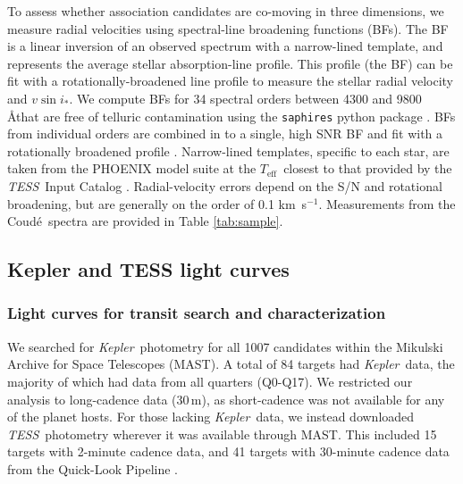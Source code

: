 \documentclass[twocolumn]{aastex631}
\newcommand{\starname}{KOI-3876}
\newcommand{\starnametwo}{Kepler-970}
\newcommand{\vsini}{$v\sin{i_*}$}
\newcommand{\kepler}{{\it Kepler}}
\newcommand{\teff}{\ensuremath{T_{\text{eff}}}}
\newcommand\kms{km~s$^{-1}$}
\newcommand{\tess}{\textit{TESS}}
\newcommand{\coude}{Coud{\'e}}
\begin{document}
To assess whether association candidates are co-moving in three dimensions, we measure radial velocities using spectral-line broadening functions (BFs). The BF is a linear inversion of an observed spectrum with a narrow-lined template, and represents the average stellar absorption-line profile. This profile (the BF) can be fit with a rotationally-broadened line profile to measure the stellar radial velocity and \vsini. We compute BFs for 34 spectral orders between 4300 and 9800 \AA that are free of telluric contamination using the {\tt saphires} python package \citep{Tofflemireetal2019}. BFs from individual orders are combined in to a single, high SNR BF and fit with a rotationally broadened profile \citep{Gray1992}. Narrow-lined templates, specific to each star, are taken from the \citet{2013A&A...553A...6H} PHOENIX model suite at the \teff\ closest to that provided by the \tess\ Input Catalog \citep[v8.0;][]{TIC2019}. Radial-velocity errors depend on the S/N and rotational broadening, but are generally on the order of 0.1 \kms. Measurements from the \coude\ spectra are provided in Table \ref{tab:sample}.

\subsection{Kepler and TESS light curves}\label{sec:lc}

\subsubsection{Light curves for transit search and characterization}
We searched for \kepler\ photometry for all 1007 candidates within the Mikulski Archive for Space Telescopes (MAST). A total of 84 targets had \kepler\ data, the majority of which had data from all quarters (Q0-Q17). We restricted our analysis to long-cadence data (30\,m), as short-cadence was not available for any of the planet hosts. For those lacking \kepler\ data, we instead downloaded \tess\ photometry wherever it was available through MAST. This included 15 targets with 2-minute cadence data, and 41 targets with 30-minute cadence data from the Quick-Look Pipeline \citep[QLP;][]{2020RNAAS...4..204H}. 



\end{document}

